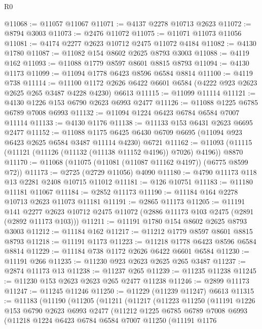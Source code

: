 \begin{lexlean}{R0}
\begin{coremodule}
@11068 := @11057 @11067
@11071 := @4137 @2278 @10713 @2623
@11072 := @8794 @3003
@11073 := @2476 @11072
@11075 := @11071 @11073 @11056
@11081 := @4174 @2277 @2623 @10712 @2475 @11072 @4184
@11082 := @4130 @1780
@11087 := @11082 @154 @8602 @2625 @8793 @3003
@11088 := @4119 @162
@11093 := @11088 @1779 @8597 @8601 @8815 @8793
@11094 := @4130 @1173
@11099 := @11094 @1778 @6423 @8596 @6584 @8814
@11100 := @4119 @738
@11114 := @11100 @1172 @2626 @6422 @6601 @6584 (@4222 @923 @2623 @2625 @265 @3487 @4228 @4230) @6613
@11115 := @11099 @11114
@11121 := @4130 @1226 @153 @6790 @2623 @6993 @2477
@11126 := @11088 @1225 @6785 @6789 @7008 @6993
@11132 := @11094 @1224 @6423 @6784 @6584 @7007 @11114
@11133 := @4130 @1176
@11138 := @11133 @153 @6431 @2623 @6695 @2477
@11152 := @11088
    @1175
    @6425
    @6430
    @6709
    @6695
    (@11094 @923 @6423 @2625 @6584 @3487 @11114 @4230)
    @6721
@11162 := @11093 (@11115 (@11121 (@11126 (@11132 (@11138 @11152 @4196)) @7026) @4196)) @8870
@11170 := @11068 (@11075 (@11081 (@11087 @11162 @4197)) (@6775 @8599 @72))
@11173 := @2725 (@2729 @11056) @4090
@11180 := @4790 @11173 @118 @13 @2281 @2408 @10715 @11012
@11181 := @126 @10751
@11183 := @11180 @11181 @11067
@11184 := @2852 @11173
@11190 := @11184 @164 @2278 @10713 @2623 @11073 @11181
@11191 := @2865 @11173
@11205 := @11191
    @141
    @2277
    @2623
    @10712
    @2475
    @11072
    (@2886 @11173 @103 @2475 (@2891 (@2892 @11173 @103)))
@11211 := @11191 @1780 @154 @8602 @2625 @8793 @3003
@11212 := @11184 @162
@11217 := @11212 @1779 @8597 @8601 @8815 @8793
@11218 := @11191 @1173
@11223 := @11218 @1778 @6423 @8596 @6584 @8814
@11229 := @11184 @738 @1172 @2626 @6422 @6601 @6584
@11230 := @11191 @266
@11235 := @11230 @923 @2623 @2625 @265 @3487
@11237 := @2874 @11173 @13
@11238 := @11237 @265
@11239 := @11235 @11238
@11245 := @11230 @153 @2623 @2623 @265 @2477 @11238
@11246 := @2899 @11173
@11247 := @11245 @11246
@11250 := @11229 (@11239 @11247) @6613
@11315 := @11183
    (@11190
      (@11205
        (@11211
          (@11217
            (@11223
              @11250
              (@11191
                @1226
                @153
                @6790
                @2623
                @6993
                @2477
                (@11212
                  @1225
                  @6785
                  @6789
                  @7008
                  @6993
                  (@11218
                    @1224
                    @6423
                    @6784
                    @6584
                    @7007
                    @11250
                    (@11191
                      @1176

\end{coremodule}
\end{lexlean}
